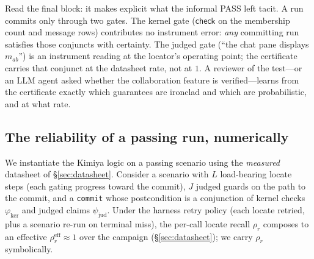 \documentclass[acmsmall,screen,nonacm]{acmart}
\newcommand{\checkk}{\mathsf{check}}
\theoremstyle{acmdefinition}%
\theoremstyle{acmplain}%
\begin{document}
Read the final block: it makes explicit what the informal PASS left
tacit. A run commits only through two gates. The kernel gate ($\checkk$
on the membership count and message rows) contributes no instrument
error: \emph{any} committing run satisfies those conjuncts with
certainty. The judged gate (``the chat pane displays $m_{ab}$'') is an
instrument reading at the locator's operating point; the certificate
carries that conjunct at the datasheet rate, not at $1$. A reviewer of the test---or an
LLM agent asked whether the collaboration feature is verified---learns
from the certificate exactly which guarantees are ironclad and which are
probabilistic, and at what rate.

\subsection{The reliability of a passing run, numerically}
\label{sec:numeric}

We instantiate the Kimiya logic on a passing scenario using the
\emph{measured} datasheet of \S\ref{sec:datasheet}. Consider a scenario
with $L$ load-bearing \textsf{locate} steps (each gating progress toward
the commit), $J$ judged guards on the path to the commit, and a
\texttt{commit} whose postcondition is a conjunction of kernel checks
$\varphi_{\mathrm{ker}}$ and judged claims $\psi_{\mathrm{jud}}$. Under the
harness retry policy (each locate retried, plus a scenario re-run on
terminal miss), the per-call locate recall $\rho_r$ composes to an
effective $\rho_r^{\mathrm{eff}}\approx 1$ over the campaign
(\S\ref{sec:datasheet}); we carry $\rho_r$ symbolically.
\end{document}
